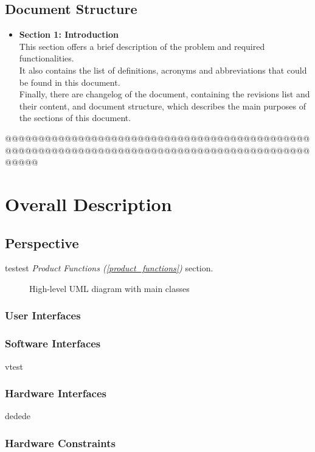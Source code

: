 \subsection{Document Structure}
\begin{itemize}
    \item {\textbf{Section 1: Introduction}\\This section offers a brief description of the problem and required functionalities. \\It also contains the list of definitions, acronyms and abbreviations that could be found in this document. \\Finally, there are changelog of the document, containing the revisions list and their content, and document structure, which describes the main purposes of the sections of this document.}

\end{itemize}
\newpage
@@@@@@@@@@@@@@@@@@@@@@@@@@@@@@@@@@@@@@@@@@@@@@@@@@@@@@@@@@@@@@@@@@@@@@@@@@@@@@@@@@@@@@@@@@@@@@@@@
\section{Overall Description}
\subsection{Perspective}
testest \textit{Product Functions (\ref{product_functions})} section.

\begin{figure}
    \hspace{-108px}
    \caption{High-level UML diagram with main classes}
    \label{class_diagram}

\end{figure}

\subsubsection{User Interfaces}


\subsubsection{Software Interfaces}
vtest
\subsubsection{Hardware Interfaces}
dedede
\subsubsection{Hardware Constraints}

